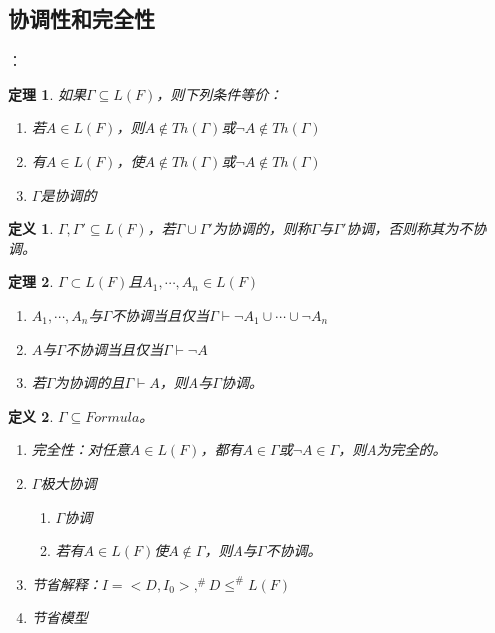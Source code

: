 \documentclass[a4paper]{ctexart}
\newtheorem{thm}{\hspace{2em}定理}[subsection]
\newtheorem{defi}{\hspace{2em}定义}[subsection]
\begin{document}
\subsection{协调性和完全性}：
\begin{thm}
  如果$\Gamma\subseteq L(F)$，则下列条件等价：
  \begin{enumerate}[itemindent=2em]
    \item 若$A\in L(F)$，则$A\not\in Th(\Gamma)$或$\neg A\not\in Th(\Gamma)$
    \item 有$A\in L(F)$，使$A\not\in Th(\Gamma)$或$\neg A\not\in Th(\Gamma)$
    \item $\Gamma$是协调的
  \end{enumerate}
\end{thm}

\begin{defi}
  $\Gamma,\Gamma'\subseteq L(F)$，若$\Gamma\cup\Gamma'$为协调的，则称$\Gamma$与$\Gamma'$协调，否则称其为不协调。
\end{defi}

\begin{thm}
  $\Gamma\subset L(F)$且$A_1,\cdots,A_n\in L(F)$
  \begin{enumerate}[itemindent=2em]
    \item $A_1,\cdots,A_n$与$\Gamma$不协调当且仅当$\Gamma\vdash\neg A_1\cup\cdots\cup\neg A_n$
    \item $A$与$\Gamma$不协调当且仅当$\Gamma\vdash\neg A$
    \item 若$\Gamma$为协调的且$\Gamma\vdash A$，则A与$\Gamma$协调。
  \end{enumerate}
\end{thm}

\begin{defi}
  $\Gamma\subseteq Formula$。
  \begin{enumerate}[itemindent=2em]
    \item 完全性：对任意$A\in L(F)$，都有$A\in\Gamma$或$\neg A\in\Gamma$，则A为完全的。
    \item $\Gamma$极大协调
    \begin{enumerate}[itemindent=3em]
      \item $\Gamma$协调
      \item 若有$A\in L(F)$使$A\not\in\Gamma$，则A与$\Gamma$不协调。
    \end{enumerate}
    \item 节省解释：$I=<D,I_0>,^\#D\leq^\#L(F)$
    \item 节省模型
  \end{enumerate}
\end{defi}
\end{document}
